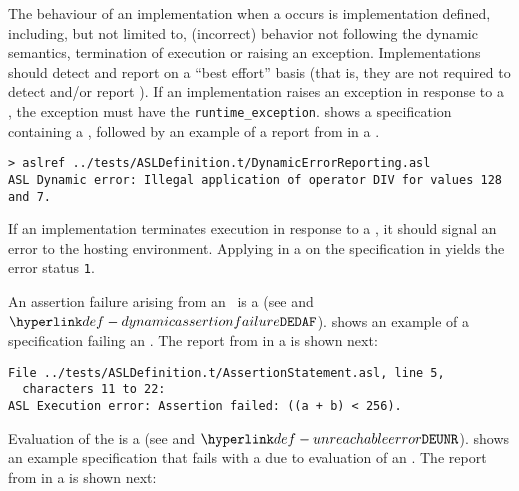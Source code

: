  The behaviour of an implementation when a \dynamicerrorterm{}
occurs is implementation defined, including, but not limited to,
(incorrect) behavior not following the dynamic semantics, termination of execution or raising an exception.
%
Implementations should detect and report \dynamicerrorsterm{} on a ``best effort'' basis
(that is, they are not required to detect and/or report \dynamicerrorsterm{}).
%
If an implementation raises an exception in response to a \dynamicerrorterm{},
the exception must have the \supertypeterm{}
\verb|runtime_exception|.
%
 shows a specification containing a \dynamicerrorterm{},
followed by an example of a report from \aslref{} in a \linuxbashshell.


\begin{Verbatim}[fontsize=\footnotesize, frame=single]
> aslref ../tests/ASLDefinition.t/DynamicErrorReporting.asl
ASL Dynamic error: Illegal application of operator DIV for values 128 and 7.
\end{Verbatim}

If an implementation terminates execution in response to a \dynamicerrorterm{},
it should signal an error to the hosting environment.
%
Applying \aslref{} in a \linuxbashshell{} on the specification in 
yields the error status \texttt{1}.

An assertion failure arising from an \assertionstatementterm\ is a \dynamicerrorterm{}
(see  and \errorcodeterm{} $\DynamicAssertionFailure$).
%
 shows an example of a specification failing
an \assertionstatementterm{}.
The report from \aslref{} in a \linuxbashshell{} is shown next:
\begin{Verbatim}[fontsize=\footnotesize, frame=single]
File ../tests/ASLDefinition.t/AssertionStatement.asl, line 5,
  characters 11 to 22:
ASL Execution error: Assertion failed: ((a + b) < 256).
\end{Verbatim}

Evaluation of the \unreachablestatementterm{} is a \dynamicerrorterm{}
(see  and \errorcodeterm{} $\UnreachableError$).
%
 shows an example specification that
fails with a \dynamicerrorsterm{} due to evaluation of an \unreachablestatementterm{}.
The report from \aslref{} in a \linuxbashshell{} is shown next:

